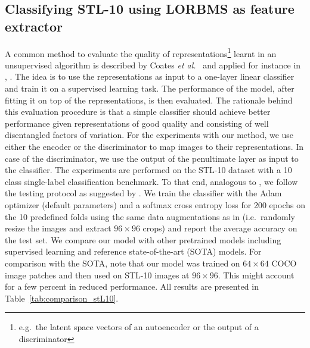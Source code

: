 \documentclass[a4paper,12pt]{report}
\begin{document}
\subsection{Classifying STL-10 using LORBMS as feature extractor}\label{subsec:linearclassifier}
A common method to evaluate the quality of representations\footnote{e.g.\ the latent space vectors of an autoencoder or the output of a discriminator} learnt in an unsupervised algorithm is described by Coates \textit{et al.}~\cite{singleLayerNetworks} and applied for instance in \cite{DCGAN}, \cite{AE_Interp}. The idea is to use the representations as input to a one-layer linear classifier and train it on a supervised learning task. The performance of the model, after fitting it on top of the representations, is then evaluated. The rationale behind this evaluation procedure is that a simple classifier should achieve better performance given representations of good quality and consisting of well disentangled factors of variation. For the experiments with our method, we use either the encoder or the discriminator to map images to their representations. In case of the discriminator, we use the output of the penultimate layer as input to the classifier. The experiments are performed on the STL-10 dataset with a 10 class single-label classification benchmark. To that end, analogous to \cite{SpotArtifacts}, we follow the testing protocol as suggested by \cite{singleLayerNetworks}. We train the classifier with the Adam optimizer (default parameters) and a softmax cross entropy loss for 200 epochs on the 10 predefined folds using the same data augmentations as in \cite{SpotArtifacts} (i.e.\ randomly resize the images and extract $96 \times 96$ crops) and report the average accuracy on the test set. We compare our model with other pretrained models including supervised learning and reference state-of-the-art (SOTA) models. For comparison with the SOTA, note that our model was trained on $64 \times 64$ COCO image patches and then used on STL-10 images at $96 \times 96$. This might account for a few percent in reduced performance. All results are presented in Table~\ref{tab:comparison_stL10}.

\end{document}
